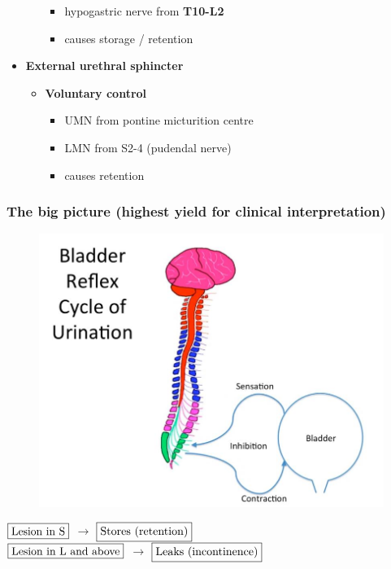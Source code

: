 \documentclass[
  12pt,
]{memoir}
\providecommand{\tightlist}{%
  \setlength{\itemsep}{0pt}\setlength{\parskip}{0pt}}
\begin{document}
\begin{itemize}
\begin{itemize}
    \begin{itemize}
    \tightlist
    \item
      hypogastric nerve from \textbf{T10-L2}
    \item
      causes storage / retention
    \end{itemize}
  \end{itemize}
\item
  \textbf{External urethral sphincter}

  \begin{itemize}
  \tightlist
  \item
    \textbf{Voluntary control}

    \begin{itemize}
    \tightlist
    \item
      UMN from pontine micturition centre
    \item
      LMN from S2-4 (pudendal nerve)
    \item
      causes retention
    \end{itemize}
  \end{itemize}
\end{itemize}

\hypertarget{the-big-picture-highest-yield-for-clinical-interpretation}{%
\subsubsection{The big picture (highest yield for clinical
interpretation)}\label{the-big-picture-highest-yield-for-clinical-interpretation}}

\begin{figure}
\centering
\includegraphics[width=.6\textwidth]{../assets/med/micturition-reflex.png}
\end{figure}

\begin{center}
$\fbox{Lesion in S}$ $\rightarrow$ $\fbox{Stores (retention)}$\\
$\fbox{Lesion in L and above}$ $\rightarrow$ $\fbox{Leaks (incontinence)}$\\

\end{center}
\end{document}
